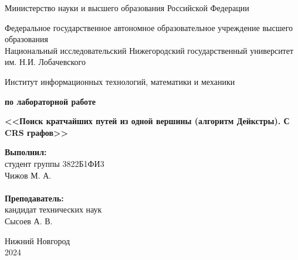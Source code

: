 \documentclass[a4paper, 14pt]{extarticle}
\begin{document}
\begin{titlepage}

\begin{center}
Министерство науки и высшего образования Российской Федерации
\end{center}

\begin{center}
Федеральное государственное автономное образовательное учреждение высшего образования \\
Национальный исследовательский Нижегородский государственный университет им. Н.И. Лобачевского
\end{center}

\begin{center}
Институт информационных технологий, математики и механики
\end{center}

\vspace{4em}

\begin{center}
\textbf{ по лабораторной работе} \\
\end{center}
\begin{center}
\textbf{\Large<<Поиск кратчайших путей из одной вершины (алгоритм Дейкстры). С CRS графов>>} \\
\end{center}

\vspace{4em}

\newbox{\lbox}
\newlength{\maxl}
\setlength{\maxl}{\wd\lbox}
\hfill\parbox{7cm}{
\hspace*{5cm}\hspace*{-5cm}\textbf{Выполнил:} \\ студент группы 3822Б1ФИ3\\Чижов М. А.\\
\\
\hspace*{5cm}\hspace*{-5cm}\textbf{Преподаватель:}\\ кандидат технических наук\\Сысоев А. В.\\
}
\vspace{\fill}

\begin{center} Нижний Новгород \\ 2024 \end{center}

\end{titlepage}
\end{document}

